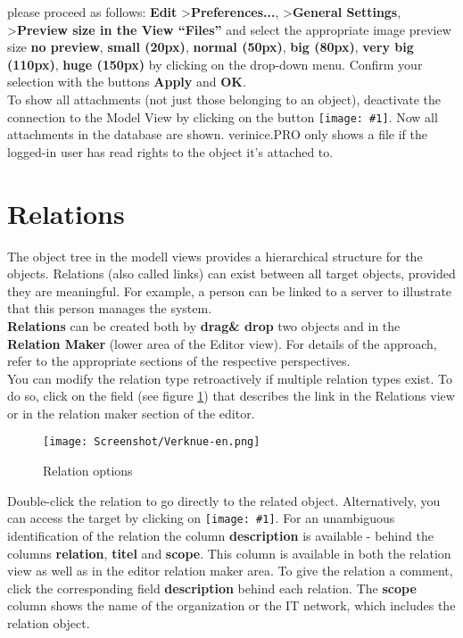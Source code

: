 \documentclass[a4paper,10pt]{book}
\newcommand{\icon}[1]{\texttt{[image: \#1]}}
\begin{document}
please proceed as follows: \textbf{Edit} \textgreater \textbf{Preferences...}, \textgreater \textbf{General Settings},
\textgreater \textbf{Preview size in the View ``Files''} and select the appropriate image preview size \textbf{no preview},
\textbf{small (20px)}, \textbf{normal (50px)}, \textbf{big (80px)}, \textbf{very big (110px)}, \textbf{huge (150px)} by clicking on the drop-down menu.
Confirm your selection with the buttons \textbf{Apply} and \textbf{OK}.
\newline\\
To show all attachments (not just those belonging to an object), deactivate the connection to the Model View by clicking on the button
\icon{Icon/Mitarbeiter.png}. Now all attachments in the database are shown. verinice.PRO only shows a file if the
logged-in user has read rights to the object it’s attached to.

\section{Relations}
The object tree in the modell views
provides a hierarchical structure for the objects.
Relations (also called links) can exist between all target objects, provided they are meaningful.
For example, a person can be linked to a server to illustrate that this person manages the system.
\newline\\
\textbf{Relations} can be created both by \textbf{drag\& drop} two objects and in the \textbf{Relation Maker}
(lower area of the Editor view). For details of the approach, refer to the appropriate sections of the respective
perspectives.
\newline\\
You can modify the relation type retroactively if multiple relation types exist. To do so, click on the field
(see figure \ref{Relation options}) that describes the link in the Relations view
or in the relation maker section of the editor.
\newline
\begin{figure}[htb!]
  \centering
  \texttt{[image: Screenshot/Verknue-en.png]}
  \caption{\label{Relation options} Relation options}
\end{figure}

Double-click the relation to go directly to the related object. Alternatively,
you can access the target by clicking on
\icon{Icon/Ziel.png}. For an unambiguous identification
of the relation the column \textbf{description} is available - behind the
columns \textbf{relation}, \textbf{titel} and \textbf{scope}. This column is
available in both the relation view as well as in the editor relation maker
area. To give the relation a comment, click the corresponding field
\textbf{description} behind each relation. The \textbf{scope} column shows the
name of the organization or the IT network, which includes the relation object.
\end{document}
